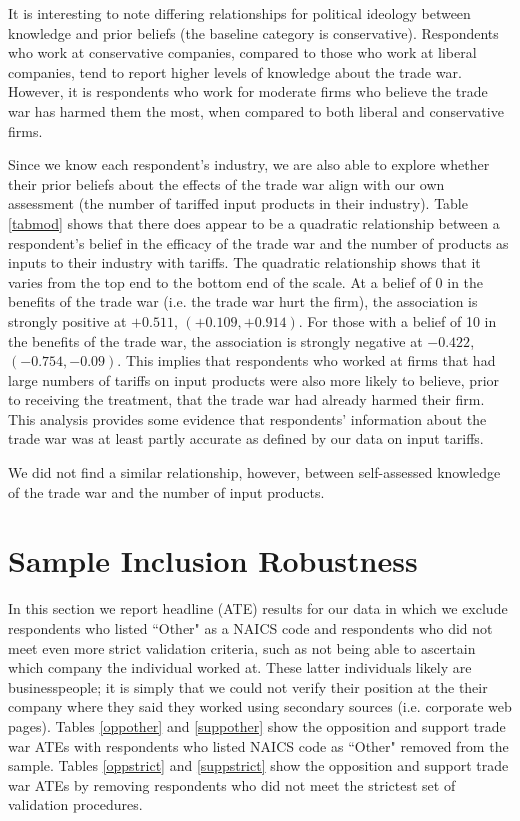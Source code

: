It is interesting to note differing relationships for political ideology between knowledge and prior beliefs (the baseline category is conservative). Respondents who work at conservative companies, compared to those who work at liberal companies, tend to report higher levels of knowledge about the trade war. However, it is respondents who work for moderate firms who believe the trade war has harmed them the most, when compared to both liberal and conservative firms.



Since we know each respondent's industry, we are also able to explore whether their prior beliefs about the effects of the trade war align with our own assessment (the number of tariffed input products in their industry). Table \ref{tabmod} shows that there does appear to be a quadratic relationship between a respondent's belief in the efficacy of the trade war and the number of products as inputs to their industry with tariffs. The quadratic relationship shows that it varies from the top end to the bottom end of the scale. At a belief of 0 in the benefits of the trade war (i.e. the trade war hurt the firm), the association is strongly positive at $+0.511$, $(+0.109, +0.914)$. For those with a belief of 10 in the benefits of the trade war, the association is strongly negative at  $-0.422$, $(-0.754, -0.09)$. This implies that respondents who worked at firms that had large numbers of tariffs on input products were also more likely to believe, prior to receiving the treatment, that the trade war had already harmed their firm. This analysis provides some evidence that respondents' information about the trade war was at least partly accurate as defined by our data on input tariffs.

We did not find a similar relationship, however, between self-assessed knowledge of the trade war and the number of input products.



\section{Sample Inclusion Robustness}

In this section we report headline (ATE) results for our data in which we exclude respondents who listed ``Other" as a NAICS code and respondents who did not meet even more strict validation criteria, such as not being able to ascertain which company the individual worked at. These latter individuals likely are businesspeople; it is simply that we could not verify their position at the their company where they said they worked using secondary sources (i.e. corporate web pages). Tables \ref{oppother} and \ref{suppother} show the opposition and support trade war ATEs with respondents who listed NAICS code as ``Other" removed from the sample. Tables \ref{oppstrict} and \ref{suppstrict} show the opposition and support trade war ATEs by removing respondents who did not meet the strictest set of validation procedures.

